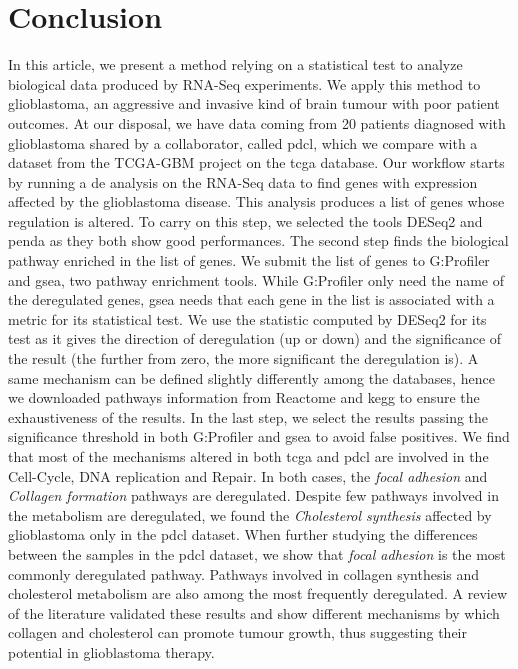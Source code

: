 \section{Conclusion}

In this article, we present a method relying on a statistical test to analyze biological data produced by RNA-Seq experiments.
We apply this method to glioblastoma, an aggressive and invasive kind of brain tumour with poor patient outcomes.
At our disposal, we have data coming from 20 patients diagnosed with glioblastoma shared by a collaborator, called \acrshort{pdcl}, which we compare with a dataset from the TCGA-GBM project on the \acrshort{tcga} database.
Our workflow starts by running a \acrlong{de} analysis on the RNA-Seq data to find genes with expression affected by the glioblastoma disease.
This analysis produces a list of genes whose regulation is altered.
To carry on this step, we selected the tools DESeq2 and \acrshort{penda} as they both show good performances.
The second step finds the biological pathway enriched in the list of genes.
We submit the list of genes to G:Profiler and \acrshort{gsea}, two pathway enrichment tools.
While G:Profiler only need the name of the deregulated genes, \acrshort{gsea} needs that each gene in the list is associated with a metric for its statistical test.
We use the statistic computed by DESeq2 for its test as it gives the direction of deregulation (up or down) and the significance of the result (the further from zero, the more significant the deregulation is).
A same mechanism can be defined slightly differently among the databases, hence we downloaded pathways information from Reactome and \acrshort{kegg} to ensure the exhaustiveness of the results.
In the last step, we select the results passing the significance threshold in both G:Profiler and \acrshort{gsea} to avoid false positives.
We find that most of the mechanisms altered in both \acrshort{tcga} and \acrshort{pdcl} are involved in the Cell-Cycle, DNA replication and Repair.
In both cases, the \textit{focal adhesion} and \textit{Collagen formation} pathways are deregulated.
Despite few pathways involved in the metabolism are deregulated, we found the \textit{Cholesterol synthesis} affected by glioblastoma only in the \acrshort{pdcl} dataset.
When further studying the differences between the samples in the \acrshort{pdcl} dataset, we show that \textit{focal adhesion} is the most commonly deregulated pathway.
Pathways involved in collagen synthesis and cholesterol metabolism are also among the most frequently deregulated.
A review of the literature validated these results and show different mechanisms by which collagen and cholesterol can promote tumour growth, thus suggesting their potential in glioblastoma therapy.